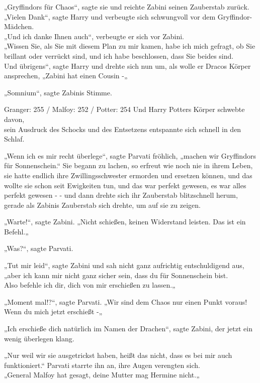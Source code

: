 {„Gryffindors für Chaos“, sagte sie und reichte Zabini seinen Zauberstab zurück.\\ „Vielen Dank“, sagte Harry und verbeugte sich schwungvoll vor dem Gryffindor-Mädchen.\\ „Und ich danke Ihnen auch“, verbeugte er sich vor Zabini.\\ „Wissen Sie, als Sie mit diesem Plan zu mir kamen, habe ich mich gefragt, ob Sie brillant oder verrückt sind, und ich habe beschlossen, dass Sie beides sind.\\ Und übrigens“, sagte Harry und drehte sich nun um, als wolle er Dracos Körper ansprechen, „Zabini hat einen Cousin -„

„Somnium“, sagte Zabinis Stimme.

Granger: 255 / Malfoy: 252 / Potter: 254 Und Harry Potters Körper schwebte davon,\\ sein Ausdruck des Schocks und des Entsetzens entspannte sich schnell in den Schlaf.

„Wenn ich es mir recht überlege“, sagte Parvati fröhlich, „machen wir Gryffindors für Sonnenschein.“ Sie begann zu lachen, so erfreut wie noch nie in ihrem Leben, sie hatte endlich ihre Zwillingsschwester ermorden und ersetzen können, und das wollte sie schon seit Ewigkeiten tun, und das war perfekt gewesen, es war alles perfekt gewesen - - und dann drehte sich ihr Zauberstab blitzschnell herum, gerade als Zabinis Zauberstab sich drehte, um auf sie zu zeigen.

„Warte!“, sagte Zabini. „Nicht schießen, keinen Widerstand leisten. Das ist ein Befehl.„

„Was?“, sagte Parvati.

„Tut mir leid“, sagte Zabini und sah nicht ganz aufrichtig entschuldigend aus,\\ „aber ich kann mir nicht ganz sicher sein, dass du für Sonnenschein bist.\\ Also befehle ich dir, dich von mir erschießen zu lassen.„

„Moment mal!?“, sagte Parvati. „Wir sind dem Chaos nur einen Punkt voraus!\\ Wenn du mich jetzt erschießt -„

„Ich erschieße dich natürlich im Namen der Drachen“, sagte Zabini, der jetzt ein wenig überlegen klang.

„Nur weil wir sie ausgetrickst haben, heißt das nicht, dass es bei mir auch funktioniert.“ Parvati starrte ihn an, ihre Augen verengten sich.\\ „General Malfoy hat gesagt, deine Mutter mag Hermine nicht.„

}
